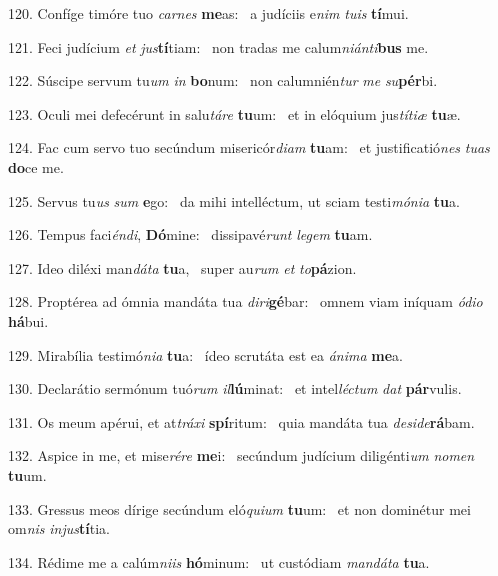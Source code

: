 120. Confíge timóre tuo \textit{car}\textit{nes} \textbf{me}as: \ast\  a judíciis e\textit{nim} \textit{tu}\textit{is} \textbf{tí}mui.\

121. Feci judícium \textit{et} \textit{jus}\textbf{tí}tiam: \ast\  non tradas me calum\textit{ni}\textit{án}\textit{ti}\textbf{bus} me.\

122. Súscipe servum tu\textit{um} \textit{in} \textbf{bo}num: \ast\  non calumnién\textit{tur} \textit{me} \textit{su}\textbf{pér}bi.\

123. Oculi mei defecérunt in salu\textit{tá}\textit{re} \textbf{tu}um: \ast\  et in elóquium jus\textit{tí}\textit{ti}\textit{æ} \textbf{tu}æ.\

124. Fac cum servo tuo secúndum misericór\textit{di}\textit{am} \textbf{tu}am: \ast\  et justificatió\textit{nes} \textit{tu}\textit{as} \textbf{do}ce me.\

125. Servus tu\textit{us} \textit{sum} \textbf{e}go: \ast\  da mihi intelléctum, ut sciam testi\textit{mó}\textit{ni}\textit{a} \textbf{tu}a.\

126. Tempus faci\textit{én}\textit{di}, \textbf{Dó}mine: \ast\  dissipavé\textit{runt} \textit{le}\textit{gem} \textbf{tu}am.\

127. Ideo diléxi man\textit{dá}\textit{ta} \textbf{tu}a, \ast\  super au\textit{rum} \textit{et} \textit{to}\textbf{pá}zion.\

128. Proptérea ad ómnia mandáta tua \textit{di}\textit{ri}\textbf{gé}bar: \ast\  omnem viam iníquam \textit{ó}\textit{di}\textit{o} \textbf{há}bui.\

129. Mirabília testimó\textit{ni}\textit{a} \textbf{tu}a: \ast\  ídeo scrutáta est ea \textit{á}\textit{ni}\textit{ma} \textbf{me}a.\

130. Declarátio sermónum tuó\textit{rum} \textit{il}\textbf{lú}minat: \ast\  et intel\textit{léc}\textit{tum} \textit{dat} \textbf{pár}vulis.\

131. Os meum apérui, et at\textit{trá}\textit{xi} \textbf{spí}ritum: \ast\  quia mandáta tua \textit{de}\textit{si}\textit{de}\textbf{rá}bam.\

132. Aspice in me, et mise\textit{ré}\textit{re} \textbf{me}i: \ast\  secúndum judícium diligénti\textit{um} \textit{no}\textit{men} \textbf{tu}um.\

133. Gressus meos dírige secúndum eló\textit{qui}\textit{um} \textbf{tu}um: \ast\  et non dominétur mei om\textit{nis} \textit{in}\textit{jus}\textbf{tí}tia.\

134. Rédime me a calúm\textit{ni}\textit{is} \textbf{hó}minum: \ast\  ut custódiam \textit{man}\textit{dá}\textit{ta} \textbf{tu}a.\

